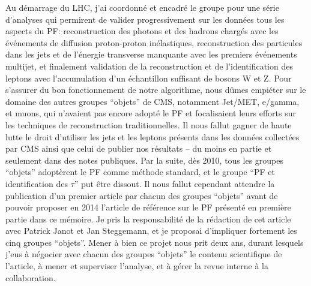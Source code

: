 Au démarrage du LHC, j'ai coordonné et encadré le groupe pour une série d'analyses qui permirent de valider progressivement sur les données tous les aspects du PF: reconstruction des photons et des hadrons chargés avec les événements de diffusion proton-proton inélastiques, reconstruction des particules dans les jets et de l'énergie transverse manquante avec les premiers événements multijet, et finalement validation de la reconstruction et de l'identification des leptons avec l'accumulation d'un échantillon suffisant de bosons W et Z. 
Pour s'assurer du bon fonctionnement de notre algorithme, nous dûmes empiéter sur le domaine des autres groupes ``objets'' de CMS, notamment Jet/MET, e/gamma, et muons, qui n'avaient pas encore adopté le PF et focalisaient leurs efforts sur les techniques de reconstruction traditionnelles. Il nous fallut gagner de haute lutte le droit d'utiliser les jets et les leptons présents dans les données collectées par CMS ainsi que celui de publier nos résultats -- du moins en partie et seulement dans des notes publiques. 
Par la suite, dès 2010, tous les groupes ``objets'' adoptèrent le PF comme méthode standard, et le groupe ``PF et identification des $\tau$'' put être dissout. 
Il nous fallut cependant attendre la publication d'un premier article par chacun des groupes ``objets'' avant de pouvoir proposer en 2014 l'article de référence sur le PF présenté en première partie dans ce mémoire. 
Je pris la responsabilité de la rédaction de cet article avec Patrick Janot et Jan Steggemann, 
et je proposai d'impliquer fortement les cinq groupes ``objets''. 
Mener à bien ce projet nous prit deux ans, durant lesquels j'eus à négocier avec chacun des groupes ``objets'' le contenu scientifique de l'article, à mener et superviser l'analyse, et à gérer la revue interne à la collaboration. 

